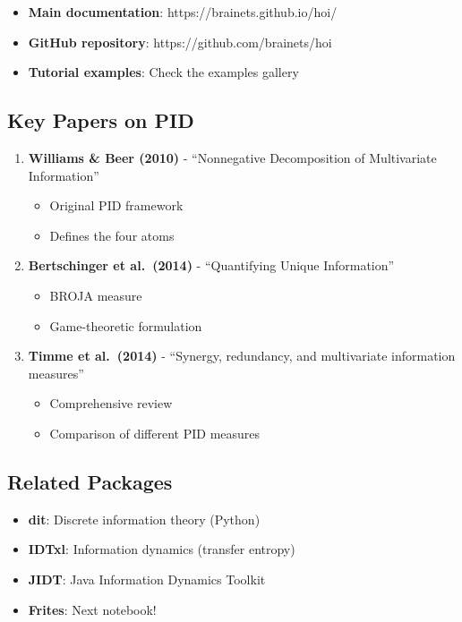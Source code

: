 \documentclass[
  11pt,
  letterpaper,
  oneside,
  openany]{book}
\providecommand{\tightlist}{%
  \setlength{\itemsep}{0pt}\setlength{\parskip}{0pt}}
\begin{document}
\begin{itemize}
\tightlist
\item
  \textbf{Main documentation}: https://brainets.github.io/hoi/
\item
  \textbf{GitHub repository}: https://github.com/brainets/hoi
\item
  \textbf{Tutorial examples}: Check the examples gallery
\end{itemize}

\subsection{Key Papers on PID}\label{key-papers-on-pid}

\begin{enumerate}
\def\labelenumi{\arabic{enumi}.}
\tightlist
\item
  \textbf{Williams \& Beer (2010)} - ``Nonnegative Decomposition of
  Multivariate Information''

  \begin{itemize}
  \tightlist
  \item
    Original PID framework
  \item
    Defines the four atoms
  \end{itemize}
\item
  \textbf{Bertschinger et al.~(2014)} - ``Quantifying Unique
  Information''

  \begin{itemize}
  \tightlist
  \item
    BROJA measure
  \item
    Game-theoretic formulation
  \end{itemize}
\item
  \textbf{Timme et al.~(2014)} - ``Synergy, redundancy, and multivariate
  information measures''

  \begin{itemize}
  \tightlist
  \item
    Comprehensive review
  \item
    Comparison of different PID measures
  \end{itemize}
\end{enumerate}

\subsection{Related Packages}\label{related-packages}

\begin{itemize}
\tightlist
\item
  \textbf{dit}: Discrete information theory (Python)
\item
  \textbf{IDTxl}: Information dynamics (transfer entropy)
\item
  \textbf{JIDT}: Java Information Dynamics Toolkit
\item
  \textbf{Frites}: Next notebook!
\end{itemize}
\end{document}
